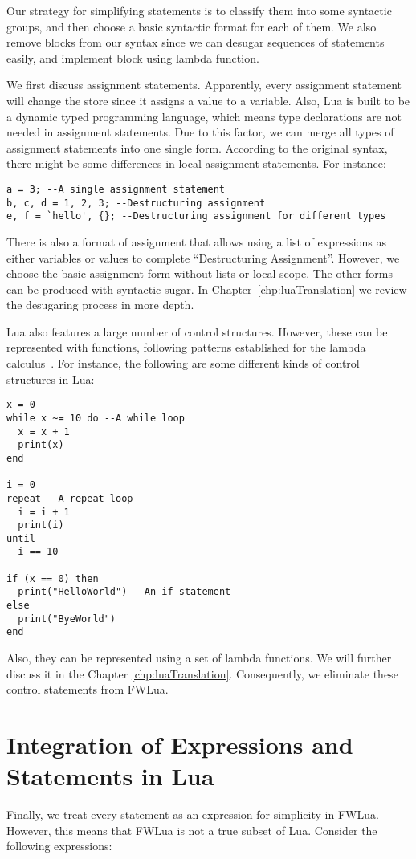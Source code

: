 Our strategy for simplifying statements is to classify them into some syntactic groups, and then choose a basic syntactic format for each of them.
We also remove blocks from our syntax since we can desugar sequences of statements easily, and implement block using lambda function.

We first discuss assignment statements. Apparently, every assignment statement will change the store since it assigns a value to a variable. Also, Lua is built to be a dynamic typed programming language, which means type declarations are not needed in assignment statements. Due to this factor, we can merge all types of assignment statements into one single form. According to the original syntax, there might be some differences in local assignment statements. For instance:

\newpage
\begin{verbatim}
a = 3; --A single assignment statement
b, c, d = 1, 2, 3; --Destructuring assignment
e, f = `hello', {}; --Destructuring assignment for different types
\end{verbatim}

There is also a format of assignment that allows using a list of expressions as either variables or values to complete ``Destructuring Assignment''. However, we choose the basic assignment form without lists or local scope. The other forms can be produced with syntactic sugar.
In Chapter~\ref{chp:luaTranslation} we review the desugaring process in more depth.

Lua also features a large number of control structures. However, these can be represented with functions, following patterns established for the lambda calculus~\cite{TAPL}. For instance, the following are some different kinds of control structures in Lua:

\begin{verbatim}
x = 0
while x ~= 10 do --A while loop
  x = x + 1
  print(x)
end

i = 0
repeat --A repeat loop
  i = i + 1
  print(i)
until
  i == 10

if (x == 0) then 
  print("HelloWorld") --An if statement
else 
  print("ByeWorld")
end
\end{verbatim}

Also, they can be represented using a set of lambda functions. We will further discuss it in the Chapter \ref{chp:luaTranslation}. Consequently, we eliminate these control statements from FWLua.

\section{Integration of Expressions and Statements in Lua}
Finally, we treat every statement as an expression for simplicity in FWLua. However, this means that FWLua is not a true subset of Lua. Consider the following expressions:

